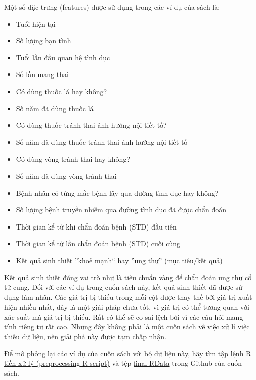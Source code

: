 Một số đặc trưng (features) được sử dụng trong các ví dụ của sách là: 
\begin{itemize} 
    \item Tuổi hiện tại
    \item Số lượng bạn tình
    \item Tuổi lần đầu quan hệ tình dục
    \item Số lần mang thai
    \item Có dùng thuốc lá hay không?
    \item Số năm đã dùng thuốc lá
    \item Có dùng thuốc tránh thai ảnh hưởng nội tiết tố?
    \item Số năm đã dùng thuốc tránh thai ảnh hưởng nội tiết tố
    \item Có dùng vòng tránh thai hay không?
    \item Số năm đã dùng vòng tránh thai
    \item Bệnh nhân có từng mắc bệnh lây qua đường tình dục hay không?
    \item Số lượng bệnh truyền nhiễm qua đường tình dục đã được chẩn đoán
    \item Thời gian kể từ khi chẩn đoán bệnh (STD) đầu tiên
    \item Thời gian kể từ lần chẩn đoán bệnh (STD) cuối cùng
    \item Kết quả sinh thiết ''khoẻ mạnh`` hay ''ung thư'' (mục tiêu/kết quả)
\end{itemize}

Kết quả sinh thiết đóng vai trò như là tiêu chuẩn vàng để chẩn đoán ung thư cổ tử cung. Đối với các ví dụ trong cuốn sách này, kết quả sinh thiết đã được sử dụng làm nhãn. Các giá trị bị thiếu trong mỗi cột được thay thế bởi giá trị xuất hiện nhiều nhất, đây là một giải pháp chưa tốt, vì giá trị có thể tương quan với xác suất mà giá trị bị thiếu. Rất có thể sẽ co sai lệch bởi vì các câu hỏi mang tính riêng tư rất cao. Nhưng đây không phải là một cuốn sách về việc xử lí việc thiếu dữ liệu, nên giải phá  này được tạm chấp nhận.

Để mô phỏng lại các ví dụ của cuốn sách với bộ dữ liệu này, hãy tìm tập lệnh \href{https://github.com/christophM/interpretable-ml-book/blob/master/R/get-cervical-cancer-dataset.R}{R tiền xử lý (preprocessing R-script)} và tệp \href{https://github.com/christophM/interpretable-ml-book/blob/master/data/cervical.RData}{final RData} trong Github của cuốn sách.
\clearpage
